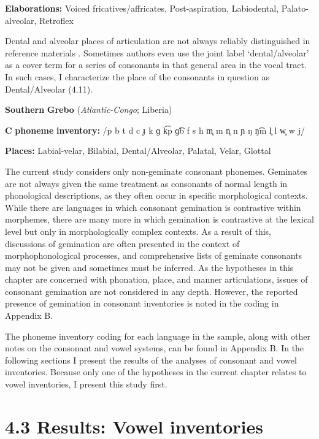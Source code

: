 \textbf{Elaborations:} Voiced fricatives/affricates, Post-aspiration, Labiodental, Palato-alveolar, Retroflex

\z

  Dental and alveolar places of articulation are not always reliably distinguished in reference materials \citep[31-32]{Maddieson1984}. Sometimes authors even use the joint label ‘dental/alveolar’ as a cover term for a series of consonants in that general area in the vocal tract. In such cases, I characterize the place of the consonants in question as Dental/Alveolar (4.11).

\ea\label{ex:(4.11)}
  \textbf{Southern} \textbf{Grebo} (\textit{Atlantic-Congo}; Liberia)

\textbf{C} \textbf{phoneme} \textbf{inventory:} /p b t d c ɟ k ɡ k͡p ɡ͡b f s h m̥ m n̥ n ɲ ŋ ŋ͡m l̥ l w̥ w j/

\textbf{Places:} Labial-velar, Bilabial, Dental/Alveolar, Palatal, Velar, Glottal

\z

  The current study considers only non-geminate consonant phonemes. Geminates are not always given the same treatment as consonants of normal length in phonological descriptions, as they often occur in specific morphological contexts. While there are languages in which consonant gemination is contrastive within morphemes, there are many more in which gemination is contrastive at the lexical level but only in morphologically complex contexts. As a result of this, discussions of gemination are often presented in the context of morphophonological processes, and comprehensive lists of geminate consonants may not be given and sometimes must be inferred. As the hypotheses in this chapter are concerned with phonation, place, and manner articulations, issues of consonant gemination are not considered in any depth. However, the reported presence of gemination in consonant inventories is noted in the coding in Appendix B.

  The phoneme inventory coding for each language in the sample, along with other notes on the consonant and vowel systems, can be found in Appendix B. In the following sections I present the results of the analyses of consonant and vowel inventories. Because only one of the hypotheses in the current chapter relates to vowel inventories, I present this study first.

\section{4.3 Results: Vowel inventories}

